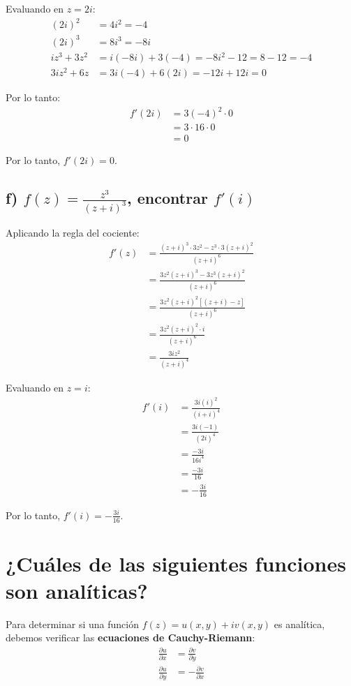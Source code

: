 \documentclass{article}
\begin{document}
Evaluando en $z = 2i$:
\begin{align*}
(2i)^2 &= 4i^2 = -4 \\
(2i)^3 &= 8i^3 = -8i \\
iz^3 + 3z^2 &= i(-8i) + 3(-4) = -8i^2 - 12 = 8 - 12 = -4 \\
3iz^2 + 6z &= 3i(-4) + 6(2i) = -12i + 12i = 0
\end{align*}

Por lo tanto:
\begin{align*}
f'(2i) &= 3(-4)^2 \cdot 0 \\
       &= 3 \cdot 16 \cdot 0 \\
       &= 0
\end{align*}

Por lo tanto, $f'(2i) = 0$.

\subsection*{f) $f(z) = \frac{z^3}{(z + i)^3}$, encontrar $f'(i)$}

Aplicando la regla del cociente:
\begin{align*}
f'(z) &= \frac{(z + i)^3 \cdot 3z^2 - z^3 \cdot 3(z + i)^2}{(z + i)^6} \\
      &= \frac{3z^2(z + i)^3 - 3z^3(z + i)^2}{(z + i)^6} \\
      &= \frac{3z^2(z + i)^2[(z + i) - z]}{(z + i)^6} \\
      &= \frac{3z^2(z + i)^2 \cdot i}{(z + i)^6} \\
      &= \frac{3iz^2}{(z + i)^4}
\end{align*}

Evaluando en $z = i$:
\begin{align*}
f'(i) &= \frac{3i(i)^2}{(i + i)^4} \\
      &= \frac{3i(-1)}{(2i)^4} \\
      &= \frac{-3i}{16i^4} \\
      &= \frac{-3i}{16} \\
      &= -\frac{3i}{16}
\end{align*}

Por lo tanto, $f'(i) = -\frac{3i}{16}$.

\newpage
\section*{¿Cuáles de las siguientes funciones son analíticas?}

Para determinar si una función $f(z) = u(x,y) + iv(x,y)$ es analítica, debemos verificar las \textbf{ecuaciones de Cauchy-Riemann}:
\begin{align}
\frac{\partial u}{\partial x} &= \frac{\partial v}{\partial y} \label{CR1} \\
\frac{\partial u}{\partial y} &= -\frac{\partial v}{\partial x} \label{CR2}
\end{align}
\end{document}
